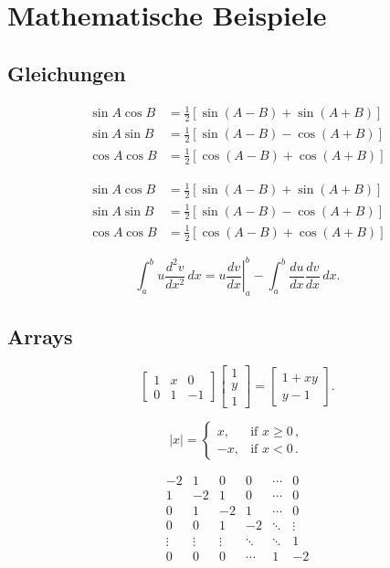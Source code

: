 \chapter{Mathematische Beispiele}
\label{sec:math}

\section{Gleichungen}

\begin{align}
\sin A \cos B &= \frac{1}{2}\left[ \sin(A-B)+\sin(A+B) \right] \\
\sin A \sin B &= \frac{1}{2}\left[ \sin(A-B)-\cos(A+B) \right] \\
\cos A \cos B &= \frac{1}{2}\left[ \cos(A-B)+\cos(A+B) \right] 
\end{align}

\begin{align*}
\sin A \cos B &= \frac{1}{2}\left[ \sin(A-B)+\sin(A+B) \right] \\
\sin A \sin B &= \frac{1}{2}\left[ \sin(A-B)-\cos(A+B) \right] \\
\cos A \cos B &= \frac{1}{2}\left[ \cos(A-B)+\cos(A+B) \right] 
\end{align*}

\[
\int_a^bu\frac{d^2v}{dx^2}\,dx
=\left.u\frac{dv}{dx}\right|_a^b
-\int_a^b\frac{du}{dx}\frac{dv}{dx}\,dx.
\]

\section{Arrays}

\[
\begin{bmatrix}
1 & x & 0 \\
0 & 1 & -1
\end{bmatrix}\begin{bmatrix}
1  \\
y  \\
1
\end{bmatrix}
=\begin{bmatrix}
1+xy  \\
y-1
\end{bmatrix}.
\]


\[
|x|=\begin{cases}
x, & \text{if }x\geq 0\,,  \\
-x, & \text{if }x< 0\,.
\end{cases}
\]


\[
\begin{matrix}
-2 & 1 & 0 & 0 & \cdots & 0  \\
1 & -2 & 1 & 0 & \cdots & 0  \\
0 & 1 & -2 & 1 & \cdots & 0  \\
0 & 0 & 1 & -2 & \ddots & \vdots \\
\vdots & \vdots & \vdots & \ddots & \ddots & 1  \\
0 & 0 & 0 & \cdots & 1 & -2
\end{matrix}
\]